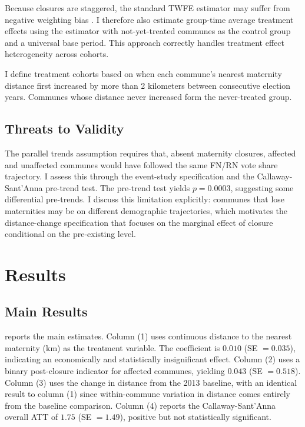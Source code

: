\documentclass[12pt]{article}
\begin{document}
Because closures are staggered, the standard TWFE estimator may suffer from negative weighting bias \citep{dechaisemartin2020two, goodmanbacon2021difference}. I therefore also estimate group-time average treatment effects using the \citet{callaway2021difference} estimator with not-yet-treated communes as the control group and a universal base period. This approach correctly handles treatment effect heterogeneity across cohorts.

I define treatment cohorts based on when each commune's nearest maternity distance first increased by more than 2 kilometers between consecutive election years. Communes whose distance never increased form the never-treated group.

\subsection{Threats to Validity}

The parallel trends assumption requires that, absent maternity closures, affected and unaffected communes would have followed the same FN/RN vote share trajectory. I assess this through the event-study specification and the Callaway-Sant'Anna pre-trend test. The pre-trend test yields $p = 0.0003$, suggesting some differential pre-trends. I discuss this limitation explicitly: communes that lose maternities may be on different demographic trajectories, which motivates the distance-change specification that focuses on the marginal effect of closure conditional on the pre-existing level.


\section{Results}

\subsection{Main Results}

 reports the main estimates. Column (1) uses continuous distance to the nearest maternity (km) as the treatment variable. The coefficient is $0.010$ (SE $= 0.035$), indicating an economically and statistically insignificant effect. Column (2) uses a binary post-closure indicator for affected communes, yielding $0.043$ (SE $= 0.518$). Column (3) uses the change in distance from the 2013 baseline, with an identical result to column (1) since within-commune variation in distance comes entirely from the baseline comparison. Column (4) reports the Callaway-Sant'Anna overall ATT of $1.75$ (SE $= 1.49$), positive but not statistically significant.
\end{document}
